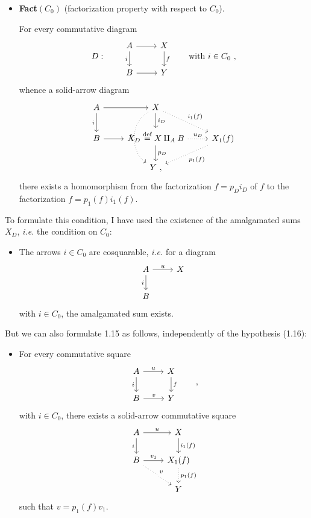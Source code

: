\documentclass[11pt]{article}
\newcommand{\printedpage}[1]{\marginpar{\footnotesize p.~#1}}
\newcommand{\msp}[1]{\marginpar{\footnotesize [#1]}}
\begin{document}
\begin{itemize}[leftmargin=5em, labelwidth=4em, labelsep=1em, align=left]
\item[(1.15)] \textbf{Fact}$(C_0)$ (factorization property with respect to $C_0$).

For every commutative diagram
\[
D : \qquad
\begin{tikzcd}
A \arrow[r] \arrow[d, "i"'] & X \arrow[d, "f"] \\
B \arrow[r] & Y
\end{tikzcd}
\qquad \text{with } i \in C_0 \ ,
\]
whence a solid-arrow diagram
\[
\begin{tikzcd}
A \arrow[r] \arrow[d, "i"'] & X \arrow[d, "i_D"] \arrow[dr, dotted, "i_1(f)"] \arrow[dd, dotted, bend right=60, "f"'] & \\
B \arrow[r] & X_D \overset{\text{def}}{=} X \amalg_A B \arrow[r, dotted, "u_D"] \arrow[d, "p_D"] & X_1(f) \arrow[dl, dotted, "p_1(f)"] \\
 & Y \ , &
\end{tikzcd}
\]
\printedpage{5}
there exists a homomorphism from the factorization $f = p_D i_D$ of $f$ to the factorization $f = p_1(f)i_1(f)$.
\end{itemize}

To formulate this condition, I have used the existence of the amalgamated sums $X_D$, \textit{i.e.} the condition on $C_0$:

\msp{page 6}

\begin{itemize}[leftmargin=5em, labelwidth=4em, labelsep=1em, align=left]
\item[(1.16)] The arrows $i \in C_0$ are cosquarable, \textit{i.e.} for a diagram
\[
\begin{tikzcd}
A \arrow[r, "u"] \arrow[d, "i"'] & X \\
B &
\end{tikzcd}
\]
with $i \in C_0$, the amalgamated sum exists.
\end{itemize}

But we can also formulate 1.15 as follows, independently of the hypothesis (1.16):

\begin{itemize}[leftmargin=5em, labelwidth=4em, labelsep=1em, align=left]
\item[(1.17)] For every commutative square
\[
\begin{tikzcd}
A \arrow[r, "u"] \arrow[d, "i"'] & X \arrow[d, "f"] \\
B \arrow[r, "v"] & Y
\end{tikzcd}
\qquad ,
\]
with $i \in C_0$, there exists a solid-arrow commutative square
\[
\begin{tikzcd}
A \arrow[r, "u"] \arrow[d, "i"'] & X \arrow[d, "i_1(f)"] \\
B \arrow[r, "v_1"] \arrow[dr, dotted, "v"] & X_1(f) \arrow[d, dotted, "p_1(f)"] \\
 & Y
\end{tikzcd}
\]
such that $v = p_1(f)v_1$.
\end{itemize}
\end{document}
